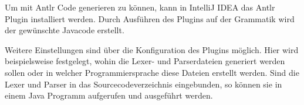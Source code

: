 Um mit Antlr Code generieren zu können, kann in IntelliJ IDEA das Antlr Plugin installiert werden. Durch Ausführen des Plugins auf der Grammatik wird der gewünschte Javacode erstellt.

Weitere Einstellungen sind über die Konfiguration des Plugins möglich. Hier wird beispielsweise festgelegt, wohin die Lexer- und Parserdateien generiert werden sollen oder in welcher Programmiersprache diese Dateien erstellt werden. 
Sind die Lexer und Parser in das Sourcecodeverzeichnis eingebunden, so können sie in einem Java Programm aufgerufen und ausgeführt werden.
